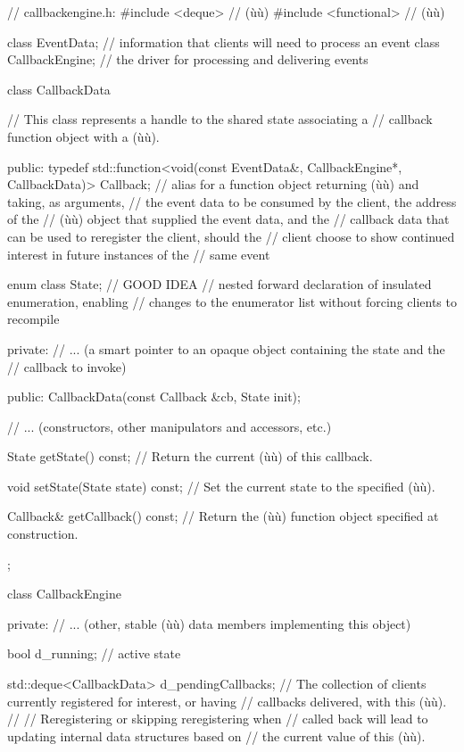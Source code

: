 \begin{emcppslisting}[emcppsbatch=e6]
// callbackengine.h:
#include <deque>          // (ù{}ù)
#include <functional>     // (ù{}ù)

class EventData;       // information that clients will need to process an event
class CallbackEngine;  // the driver for processing and delivering events

class CallbackData
{
    // This class represents a handle to the shared state associating a
    // callback function object with a (ù{}ù).

public:
    typedef std::function<void(const EventData&, CallbackEngine*,
        CallbackData)> Callback;
        // alias for a function object returning (ù{}ù) and taking, as arguments,
        // the event data to be consumed by the client, the address of the
        // (ù{}ù) object that supplied the event data, and the
        // callback data that can be used to reregister the client, should the
        // client choose to show continued interest in future instances of the
        // same event

    enum class State;  // GOOD IDEA
        // nested forward declaration of insulated enumeration, enabling
        // changes to the enumerator list without forcing clients to recompile

private:
    // ... (a smart pointer to an opaque object containing the state and the
    //      callback to invoke)

public:
    CallbackData(const Callback &cb, State init);

    // ... (constructors, other manipulators and accessors, etc.)

    State getState() const;
        // Return the current (ù{}ù) of this callback.

    void setState(State state) const;
        // Set the current state to the specified (ù{}ù).

    Callback& getCallback() const;
        // Return the (ù{}ù) function object specified at construction.
};

class CallbackEngine
{
private:
    // ... (other, stable (ù{}ù) data members implementing this object)

    bool d_running;  // active state

    std::deque<CallbackData> d_pendingCallbacks;
        // The collection of clients currently registered for interest, or having
        // callbacks delivered, with this (ù{}ù).
        //
        // Reregistering or skipping reregistering when
        // called back will lead to updating internal data structures based on
        // the current value of this (ù{}ù).

}
\end{emcppslisting}
